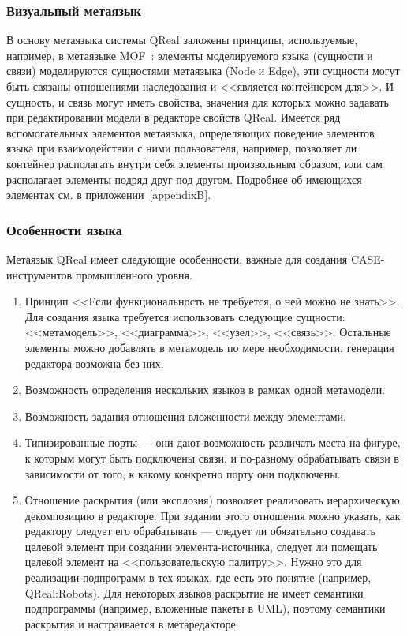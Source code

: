 \subsubsection{Визуальный метаязык}
В основу метаязыка системы QReal заложены принципы, используемые, например, в метаязыке MOF~\cite{mof}: 
элементы моделируемого языка (сущности и связи) моделируются сущностями метаязыка 
(Node и Edge), эти сущности могут быть связаны отношениями наследования и <<является контейнером для>>. 
И сущность, и связь могут иметь свойства, значения для которых можно задавать при 
редактировании модели в редакторе свойств QReal. Имеется ряд вспомогательных элементов 
метаязыка, определяющих поведение элементов языка при взаимодействии с ними пользователя, 
например, позволяет ли контейнер располагать внутри себя элементы произвольным образом, 
или сам располагает элементы подряд друг под другом. Подробнее об имеющихся элементах 
см. в приложении~\ref{appendixB}.

\subsubsection{Особенности языка}
Метаязык QReal имеет следующие особенности, важные для создания CASE-инструментов 
промышленного уровня.

\begin{enumerate}
	\item Принцип <<Если функциональность не требуется, о ней можно не знать>>. Для создания
		языка требуется использовать следующие сущности: <<метамодель>>, <<диаграмма>>,
		<<узел>>, <<связь>>. Остальные элементы можно добавлять в метамодель по мере необходимости,
		генерация редактора возможна без них.
	\item Возможность определения нескольких языков в рамках одной метамодели. 
	\item Возможность задания отношения вложенности между элементами.
	\item Типизированные порты --- они дают возможность различать места на фигуре, к которым 
		могут быть подключены связи, и по-разному обрабатывать связи в зависимости от 
		того, к какому конкретно порту они подключены.
	\item Отношение раскрытия (или эксплозия) позволяет реализовать иерархическую декомпозицию
		в редакторе. При задании этого отношения можно указать, как редактору следует его 
		обрабатывать --- следует ли обязательно создавать целевой элемент при создании 
		элемента-источника, следует ли помещать целевой элемент на <<пользовательскую палитру>>.
		Нужно это для реализации подпрограмм в тех языках, где есть это понятие (например, QReal:Robots).
		Для некоторых языков раскрытие не имеет семантики подпрограммы (например, вложенные пакеты
		в UML), поэтому семантики раскрытия и настраивается в метаредакторе.
\end{enumerate}

